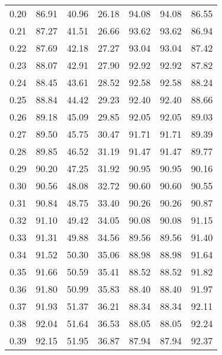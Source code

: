 \begin{tabular}{|c|c|c|c|c|c|c|}
      0.20 &     86.91 &     40.96 &      26.18 &   94.08 &      94.08 &         86.55 \\
      0.21 &     87.27 &     41.51 &      26.66 &   93.62 &      93.62 &         86.94 \\
      0.22 &     87.69 &     42.18 &      27.27 &   93.04 &      93.04 &         87.42 \\
      0.23 &     88.07 &     42.91 &      27.90 &   92.92 &      92.92 &         87.82 \\
      0.24 &     88.45 &     43.61 &      28.52 &   92.58 &      92.58 &         88.24 \\
      0.25 &     88.84 &     44.42 &      29.23 &   92.40 &      92.40 &         88.66 \\
      0.26 &     89.18 &     45.09 &      29.85 &   92.05 &      92.05 &         89.03 \\
      0.27 &     89.50 &     45.75 &      30.47 &   91.71 &      91.71 &         89.39 \\
      0.28 &     89.85 &     46.52 &      31.19 &   91.47 &      91.47 &         89.77 \\
      0.29 &     90.20 &     47.25 &      31.92 &   90.95 &      90.95 &         90.16 \\
      0.30 &     90.56 &     48.08 &      32.72 &   90.60 &      90.60 &         90.55 \\
      0.31 &     90.84 &     48.75 &      33.40 &   90.26 &      90.26 &         90.87 \\
      0.32 &     91.10 &     49.42 &      34.05 &   90.08 &      90.08 &         91.15 \\
      0.33 &     91.31 &     49.88 &      34.56 &   89.56 &      89.56 &         91.40 \\
      0.34 &     91.52 &     50.30 &      35.06 &   88.98 &      88.98 &         91.64 \\
      0.35 &     91.66 &     50.59 &      35.41 &   88.52 &      88.52 &         91.82 \\
      0.36 &     91.80 &     50.99 &      35.83 &   88.40 &      88.40 &         91.97 \\
      0.37 &     91.93 &     51.37 &      36.21 &   88.34 &      88.34 &         92.11 \\
      0.38 &     92.04 &     51.64 &      36.53 &   88.05 &      88.05 &         92.24 \\
      0.39 &     92.15 &     51.95 &      36.87 &   87.94 &      87.94 &         92.37 \\

\end{tabular}
